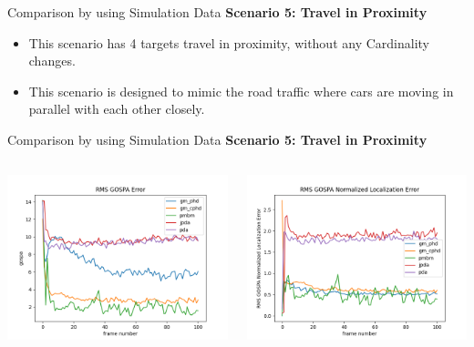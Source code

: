 \documentclass[12pt]{beamer}
\let\olditem\item
\renewcommand\item{\olditem\justifying}
\begin{document}
\begin{frame}{Comparison by using Simulation Data}
\textbf{Scenario 5: Travel in Proximity}
	\begin{itemize}
		    \item This scenario has 4 targets travel in proximity, without any Cardinality changes.
		    \item This scenario is designed to mimic the road traffic where cars are moving in parallel with each other closely.
	\end{itemize}
\end{frame}

\begin{frame}{Comparison by using Simulation Data}
\textbf{Scenario 5: Travel in Proximity}
\begin{columns}[t]
  \begin{column}{0.5\linewidth}
      \centering
      \includegraphics[width=\linewidth,height=\textheight,keepaspectratio]{real_data/scenario5/gospa.png}\\
  \end{column}
    \begin{column}{0.5\linewidth}
      \centering
      \includegraphics[width=\linewidth,height=\textheight,keepaspectratio]{real_data/scenario5/gospa_localization.png}\\

\end{column}
\end{columns}
\end{frame}
\end{document}
